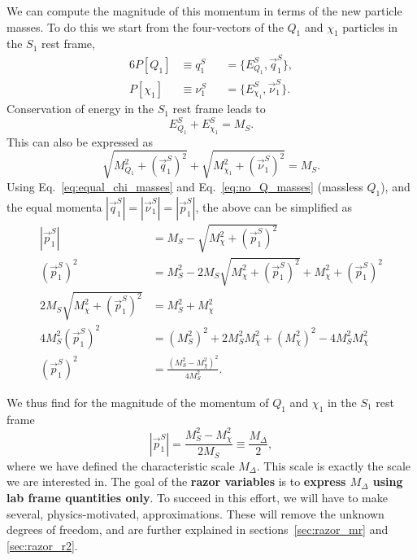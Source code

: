 We can compute the magnitude of this momentum in terms of the new particle masses. To do this we
start from the four-vectors of the $Q_1$ and $\chi_1$ particles in the $S_1$ rest frame, 
\begin{alignat}{6}
  P[Q_1]    &\equiv q_1^S   &&= \{ E^S_{Q_1}, \vec{q}^S_1\} , \\
  P[\chi_1] &\equiv \nu_1^S &&= \{ E^S_{\chi_1}, \vec{\nu}^S_1\} .
\end{alignat}
Conservation of energy in the $S_1$ rest frame leads to 
\begin{equation}
  E^S_{Q_1} + E^S_{\chi_1} = M_S . \label{eq:razor_conservation_energy}
\end{equation}
This can also be expressed as
\begin{equation}
  \sqrt{M_{Q_1}^2 + (\vec{q}^S_1)^2 } + \sqrt{M_{\chi_1}^2 + (\vec{\nu}^S_1)^2} = M_S .
\end{equation}
Using Eq.~\ref{eq:equal_chi_masses} and Eq.~\ref{eq:no_Q_masses} (massless $Q_1$), and the equal
momenta $|\vec{q}^S_1| = |\vec{\nu}^S_1| = |\vec{p}^S_1|$, the above can be simplified as
\begin{align}
  |\vec{p}^S_1|   &= M_S - \sqrt{M_{\chi}^2 + (\vec{p}^S_1)^2} \\
  (\vec{p}^S_1)^2 &= M_S^2 - 2 M_S \sqrt{M_{\chi}^2 + (\vec{p}^S_1)^2} + M_{\chi}^2 +
(\vec{p}^S_1)^2 \\
  2 M_S \sqrt{M_{\chi}^2 + (\vec{p}^S_1)^2} &= M_S^2 + M_{\chi}^2 \\
  4 M_S^2 (\vec{p}^S_1)^2 &= (M_S^2)^2 + 2 M_S^2 M_{\chi}^2 + (M_{\chi}^2)^2 - 4 M_S^2
M_{\chi}^2 \\
  (\vec{p}^S_1)^2 &= \frac{(M_S^2 -M_{\chi}^2 )^2}{4 M_S^2} .
\end{align}

We thus find for the magnitude of the momentum of $Q_1$ and $\chi_1$ in the $S_1$ rest frame
\begin{equation}
  |\vec{p}^S_1| = \frac{M_S^2 -M_{\chi}^2}{2 M_S} \equiv \frac{M_\Delta}{2} ,
\label{eq:razor_p_S1_rest_frame}
\end{equation}
where we have defined the characteristic scale $M_\Delta$. This scale is exactly the scale we are
interested in. The goal of the \textbf{razor variables} is to \textbf{express $M_\Delta$ using lab
frame quantities only}. To succeed in this effort, we will have to make several, physics-motivated,
approximations. These will remove the unknown degrees of freedom, and are further explained in
sections~\ref{sec:razor_mr} and \ref{sec:razor_r2}. 

